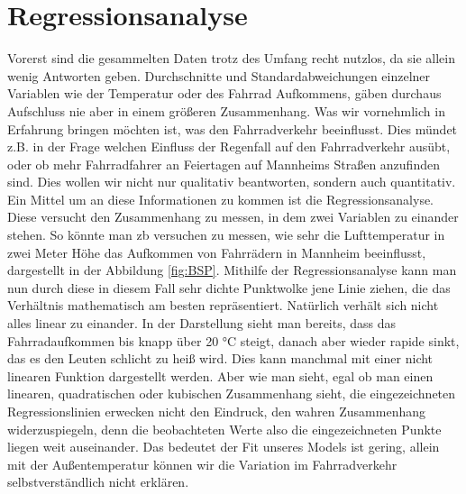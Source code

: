 \documentclass[a4paper,12pt]{thesis}
\begin{document}
\section{Regressionsanalyse}

Vorerst sind die gesammelten Daten trotz des Umfang recht nutzlos, da sie allein wenig Antworten geben. Durchschnitte und Standardabweichungen einzelner Variablen wie der Temperatur oder des Fahrrad Aufkommens, gäben durchaus Aufschluss nie aber in einem größeren Zusammenhang. Was wir vornehmlich in Erfahrung bringen möchten ist, was den Fahrradverkehr beeinflusst. Dies mündet z.B. in der Frage welchen Einfluss der Regenfall auf den Fahrradverkehr ausübt, oder ob mehr Fahrradfahrer an Feiertagen auf Mannheims Straßen anzufinden sind. Dies wollen wir nicht nur qualitativ beantworten, sondern auch quantitativ.\\

Ein Mittel um an diese Informationen zu kommen ist die Regressionsanalyse. Diese versucht den Zusammenhang zu messen, in dem zwei Variablen zu einander stehen. So könnte man zb versuchen zu messen, wie sehr die Lufttemperatur in zwei Meter Höhe das Aufkommen von Fahrrädern in Mannheim beeinflusst, dargestellt in der Abbildung \ref{fig:BSP}. Mithilfe der Regressionsanalyse kann man nun durch diese in diesem Fall sehr dichte Punktwolke jene Linie ziehen, die das Verhältnis mathematisch am besten repräsentiert. Natürlich verhält sich nicht alles linear zu einander. In der Darstellung sieht man bereits, dass das Fahrradaufkommen bis knapp über 20 °C steigt, danach aber wieder rapide sinkt, das es den Leuten schlicht zu heiß wird. Dies kann manchmal mit einer nicht linearen Funktion dargestellt werden. Aber wie man sieht, egal ob man einen linearen, quadratischen oder kubischen Zusammenhang sieht, die eingezeichneten Regressionslinien erwecken nicht den Eindruck, den wahren Zusammenhang widerzuspiegeln, denn die beobachteten Werte also die eingezeichneten Punkte liegen weit auseinander. Das bedeutet der Fit unseres Models ist gering, allein mit der Außentemperatur können wir die Variation im Fahrradverkehr selbstverständlich nicht erklären.\\
\end{document}
